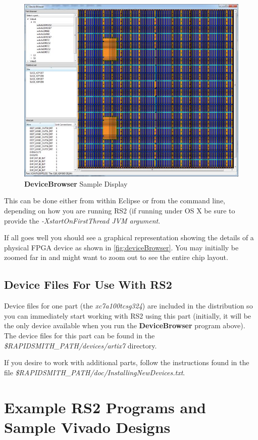 \documentclass[12pt]{article}
\newcommand{\fil}[1]{{\em #1}}
\newcommand{\opt}[1]{{\em #1}}
\newcommand{\pgm}[1]{{\textbf{#1}}}
\newcommand{\dir}[1]{{\em #1}}
\begin{document}
\begin{figure}[htb]
\centering
\includegraphics[width=0.8\columnwidth]{deviceBrowser}
\caption{\pgm{DeviceBrowser} Sample Display}
\label{fig:deviceBrowser}
\end{figure}

\noindent This can be done either from within Eclipse or from the command line,
depending on how you are running RS2 (if running under OS X be sure to provide the
\opt{-XstartOnFirstThread JVM argument}.

If all goes well you should see a graphical representation showing the details
of a physical FPGA device as shown in \autoref{fig:deviceBrowser}.  You may
initially be zoomed far in and might want to zoom out to see the entire chip
layout.

\subsection{Device Files For Use With RS2}
Device files for one part (the {\em xc7a100tcsg324}) are included in the
distribution so you can immediately start working with RS2 using this part (initially, it
will be the only device available when you run the \pgm{DeviceBrowser} program
above).  The device files for this part can be found in the
\dir{\${RAPIDSMITH\_PATH}/devices/artix7} directory.               

If you desire to work with additional parts, follow the instructions found in the
file \fil{\$RAPIDSMITH\_PATH/doc/InstallingNewDevices.txt}.

\section{Example RS2 Programs and Sample Vivado Designs}
\end{document}
